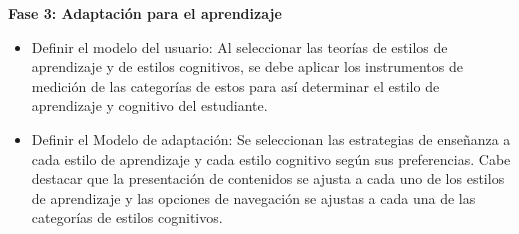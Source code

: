\textbf{Fase 3: Adaptación para el aprendizaje}
\begin{itemize}
\item Definir el modelo del usuario:  Al seleccionar las teorías de estilos de aprendizaje y de estilos cognitivos, se debe aplicar los instrumentos de medición de las categorías de estos para así determinar el estilo de aprendizaje y cognitivo del estudiante.

\item Definir el Modelo de adaptación: Se seleccionan las estrategias de enseñanza a cada estilo de aprendizaje y cada estilo cognitivo según sus preferencias. Cabe destacar que la presentación de contenidos se ajusta a cada uno de los estilos de aprendizaje y las opciones de navegación se ajustas a cada una de las categorías de estilos cognitivos.
\end{itemize}